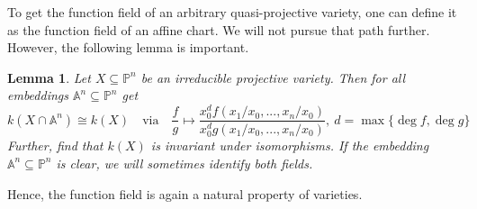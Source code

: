 \documentclass{scrartcl}
\newcommand{\Aff}{\mathbb{A}}
\newcommand{\Proj}{\mathbb{P}}
\newtheorem{lemma}[prop]{Lemma}
\theoremstyle{definition}
\begin{document}
To get the function field of an arbitrary quasi-projective variety, one can define it as the function field of an affine chart.
We will not pursue that path further.
However, the following lemma is important.
\begin{lemma}
    Let $X \subseteq \Proj^n$ be an irreducible projective variety. Then for all embeddings $\Aff^n \subseteq \Proj^n$ get
    \begin{equation*}
        k(X \cap \Aff^n) \cong k(X) \quad \text{via} \quad \frac f g \mapsto \frac {x_0^d f({x_1} / {x_0}, ..., {x_n} / {x_0})} {x_0^d g({x_1} / {x_0}, ..., {x_n} / {x_0})}, \ d = \max \{\deg f, \deg g\}
    \end{equation*}
    Further, find that $k(X)$ is invariant under isomorphisms.
    If the embedding $\Aff^n \subseteq \Proj^n$ is clear, we will sometimes identify both fields.
\end{lemma}
Hence, the function field is again a natural property of varieties.
\end{document}

